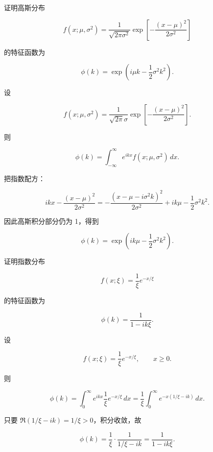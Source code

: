 ﻿


\begin{question}
证明高斯分布

\[
f(x;\mu,\sigma^2)=\frac{1}{\sqrt{2\pi\sigma^2}}\exp\left[-\frac{(x-\mu)^2}{2\sigma^2}\right]
\]

的特征函数为

\[
\phi(k)=\exp\left(i\mu k-\frac12\sigma^2k^2\right).
\]
\begin{solution}
设

\[
f(x;\mu,\sigma^2)=\frac{1}{\sqrt{2\pi}\sigma}\exp\!\left[-\frac{(x-\mu)^2}{2\sigma^2}\right].
\]

则

\[
\phi(k)=\int_{-\infty}^{\infty} e^{ikx} f(x;\mu,\sigma^2)\,dx.
\]

把指数配方：

\[
ikx-\frac{(x-\mu)^2}{2\sigma^2}
=
-\frac{(x-\mu-i\sigma^2 k)^2}{2\sigma^2}+ik\mu-\frac12\sigma^2k^2.
\]

因此高斯积分部分仍为 1，得到

\[
\phi(k)=\exp\!\left(ik\mu-\frac12\sigma^2k^2\right).
\]
\end{solution}
\end{question}


\begin{question}
证明指数分布

\[
f(x;\xi)=\frac1\xi e^{-x/\xi}
\]

的特征函数为

\[
\phi(k)=\frac{1}{1-ik\xi}.
\]
\begin{solution}
设

\[
f(x;\xi)=\frac1{\xi}e^{-x/\xi},\qquad x\ge 0.
\]

则

\[
\phi(k)=\int_0^\infty e^{ikx}\frac1{\xi}e^{-x/\xi}\,dx
=\frac1{\xi}\int_0^\infty e^{-x(1/\xi-ik)}\,dx.
\]

只要 \(\Re(1/\xi-ik)=1/\xi>0\)，积分收敛，故

\[
\phi(k)=\frac1{\xi}\cdot \frac1{1/\xi-ik}
=\frac1{1-ik\xi}.
\]
\end{solution}
\end{question}


